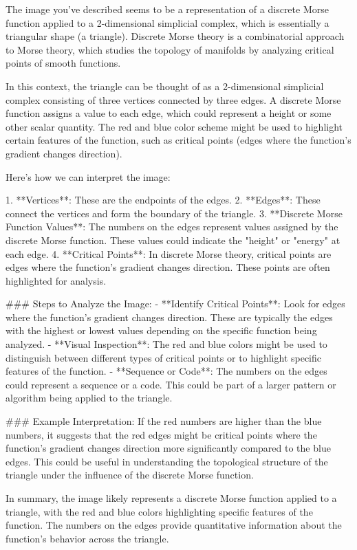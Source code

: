 The image you've described seems to be a representation of a discrete Morse function applied to a 2-dimensional simplicial complex, which is essentially a triangular shape (a triangle). Discrete Morse theory is a combinatorial approach to Morse theory, which studies the topology of manifolds by analyzing critical points of smooth functions.

In this context, the triangle can be thought of as a 2-dimensional simplicial complex consisting of three vertices connected by three edges. A discrete Morse function assigns a value to each edge, which could represent a height or some other scalar quantity. The red and blue color scheme might be used to highlight certain features of the function, such as critical points (edges where the function's gradient changes direction).

Here’s how we can interpret the image:

1. **Vertices**: These are the endpoints of the edges.
2. **Edges**: These connect the vertices and form the boundary of the triangle.
3. **Discrete Morse Function Values**: The numbers on the edges represent values assigned by the discrete Morse function. These values could indicate the "height" or "energy" at each edge.
4. **Critical Points**: In discrete Morse theory, critical points are edges where the function's gradient changes direction. These points are often highlighted for analysis.

### Steps to Analyze the Image:
- **Identify Critical Points**: Look for edges where the function's gradient changes direction. These are typically the edges with the highest or lowest values depending on the specific function being analyzed.
- **Visual Inspection**: The red and blue colors might be used to distinguish between different types of critical points or to highlight specific features of the function.
- **Sequence or Code**: The numbers on the edges could represent a sequence or a code. This could be part of a larger pattern or algorithm being applied to the triangle.

### Example Interpretation:
If the red numbers are higher than the blue numbers, it suggests that the red edges might be critical points where the function's gradient changes direction more significantly compared to the blue edges. This could be useful in understanding the topological structure of the triangle under the influence of the discrete Morse function.

In summary, the image likely represents a discrete Morse function applied to a triangle, with the red and blue colors highlighting specific features of the function. The numbers on the edges provide quantitative information about the function's behavior across the triangle.